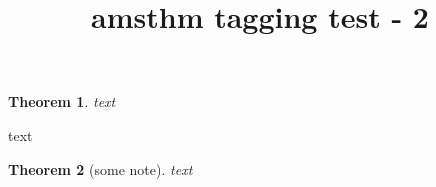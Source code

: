 \documentclass{article}
\title{amsthm tagging test - 2}
\theoremstyle{citing}
\newtheorem{theorem}{Theorem}
\begin{document}
\begin{theorem}
text
\end{theorem}
text
\begin{theorem}[some note]
text
\end{theorem}
\end{document}
